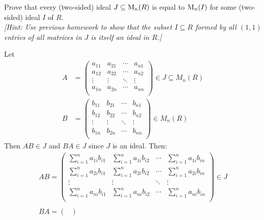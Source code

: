 \begin{problem}
\begin{enumalph}
    \newpage
    \item Prove that every (two-sided) ideal $J \subseteq \operatorname{M}_n(R)$ is equal to $\operatorname{M}_n(I)
    $ for some (two-sided) ideal $I$ of $R$. \\
    \emph{[Hint: Use previous homework to show that the subset
      $I \subseteq R$ formed by all $(1,1)$ entries of all matrices 
      in $J$ is itself an ideal in $R$.]}
    \begin{Answer}
      Let
      \begin{align*}
      A &= \begin{pmatrix}
        a_{11} & a_{21} & \cdots & a_{n1} \\
        a_{12} & a_{22} & \cdots & a_{n2} \\
        \vdots & \vdots & \ddots & \vdots \\
        a_{1n} & a_{2n} & \cdots & a_{nn} \\
      \end{pmatrix} \in J \subseteq M_n(R) \\
      B &= \begin{pmatrix}
        b_{11} & b_{21} & \cdots & b_{n1} \\
        b_{12} & b_{22} & \cdots & b_{n2} \\
        \vdots & \vdots & \ddots & \vdots \\
        b_{1n} & b_{2n} & \cdots & b_{nn} \\
      \end{pmatrix} \in M_n(R)
      \end{align*}
      Then $AB \in J$ and $BA \in J$ since $J$ is an ideal. Then: \\
      \begin{align*}
        AB =
        \begin{pmatrix}
          \sum_{i=1}^n a_{1i}b_{i1} & \sum_{i=1}^n a_{1i}b_{i2} & \cdots & \sum_{i=1}^n a_{1i}b_{in} \\
          \sum_{i=1}^n a_{2i}b_{i1} & \sum_{i=1}^n a_{2i}b_{i2} & \cdots & \sum_{i=1}^n a_{2i}b_{in} \\
          \vdots & \vdots & \ddots & \vdots \\
          \sum_{i=1}^n a_{ni}b_{i1} & \sum_{i=1}^n a_{ni}b_{i2} & \cdots & \sum_{i=1}^n a_{ni}b_{in} \\
        \end{pmatrix} \in J \\
        \\
        BA = \begin{pmatrix}

\end{pmatrix}
\end{align*}
\end{Answer}
\end{enumalph}
\end{problem}
